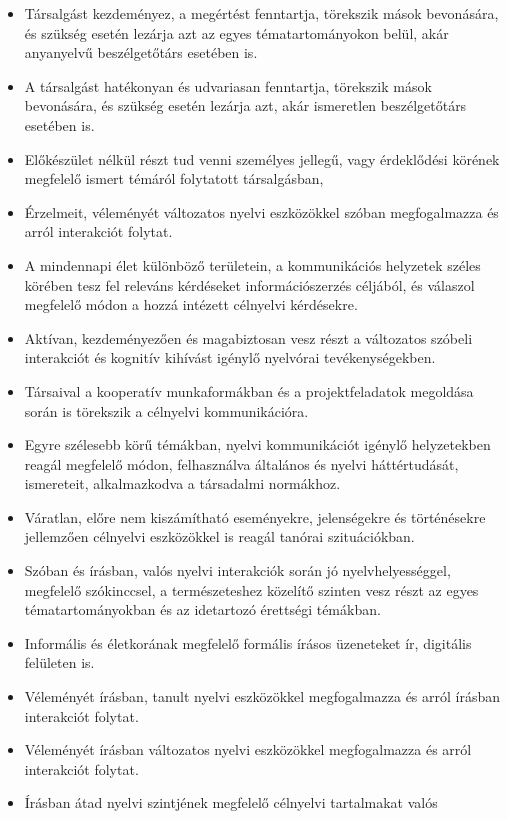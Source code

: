 \begin{itemize}
\item
  Társalgást kezdeményez, a megértést fenntartja, törekszik mások
  bevonására, és szükség esetén lezárja azt az egyes tématartományokon
  belül, akár anyanyelvű beszélgetőtárs esetében is.
\item
  A társalgást hatékonyan és udvariasan fenntartja, törekszik mások
  bevonására, és szükség esetén lezárja azt, akár ismeretlen
  beszélgetőtárs esetében is.
\item
  Előkészület nélkül részt tud venni személyes jellegű, vagy érdeklődési
  körének megfelelő ismert témáról folytatott társalgásban,
\item
  Érzelmeit, véleményét változatos nyelvi eszközökkel szóban
  megfogalmazza és arról interakciót folytat.
\item
  A mindennapi élet különböző területein, a kommunikációs helyzetek
  széles körében tesz fel releváns kérdéseket információszerzés
  céljából, és válaszol megfelelő módon a hozzá intézett célnyelvi
  kérdésekre.
\item
  Aktívan, kezdeményezően és magabiztosan vesz részt a változatos
  szóbeli interakciót és kognitív kihívást igénylő nyelvórai
  tevékenységekben.
\item
  Társaival a kooperatív munkaformákban és a projektfeladatok megoldása
  során is törekszik a célnyelvi kommunikációra.
\item
  Egyre szélesebb körű témákban, nyelvi kommunikációt igénylő
  helyzetekben reagál megfelelő módon, felhasználva általános és nyelvi
  háttértudását, ismereteit, alkalmazkodva a társadalmi normákhoz.
\item
  Váratlan, előre nem kiszámítható eseményekre, jelenségekre és
  történésekre jellemzően célnyelvi eszközökkel is reagál tanórai
  szituációkban.
\item
  Szóban és írásban, valós nyelvi interakciók során jó
  nyelvhelyességgel, megfelelő szókinccsel, a természeteshez közelítő
  szinten vesz részt az egyes tématartományokban és az idetartozó
  érettségi témákban.
\item
  Informális és életkorának megfelelő formális írásos üzeneteket ír,
  digitális felületen is.
\item
  Véleményét írásban, tanult nyelvi eszközökkel megfogalmazza és arról
  írásban interakciót folytat.
\item
  Véleményét írásban változatos nyelvi eszközökkel megfogalmazza és
  arról interakciót folytat.
\item
  Írásban átad nyelvi szintjének megfelelő célnyelvi tartalmakat valós

\end{itemize}

